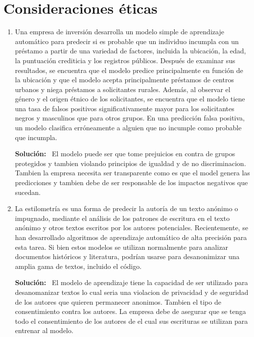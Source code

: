 \documentclass[11pt,letterpaper]{article}
\newenvironment{solution}{%
  \noindent\begin{shaded}
  \textbf{Solución:}\ }{
  \end{shaded}%
}
\begin{document}
\section*{Consideraciones éticas}

\begin{enumerate}
\item%
  Una empresa de inversión desarrolla un modelo simple de aprendizaje
  automático para predecir si es probable que un individuo incumpla
  con un préstamo a partir de una variedad de factores, incluida la
  ubicación, la edad, la puntuación crediticia y los registros
  públicos.  Después de examinar sus resultados, se encuentra que el
  modelo predice principalmente en función de la ubicación y que el
  modelo acepta principalmente préstamos de centros urbanos y niega
  préstamos a solicitantes rurales.  Además, al observar el género y
  el origen étnico de los solicitantes, se encuentra que el modelo
  tiene una tasa de falsos positivos significativamente mayor para los
  solicitantes negros y masculinos que para otros grupos.  En una
  predicción falsa positiva, un modelo clasifica erróneamente a
  alguien que no incumple como probable que incumpla.
  \begin{solution}
    El modelo puede ser que tome prejuicios en contra de grupos protegidos y tambien violando principios de igualdad y de no discriminacion. Tambien la empresa necesita ser transparente como es que el model genera las predicciones y tambien debe de ser responsable de los impactos negativos que sucedan. 
  \end{solution}
\item%
  La estilometría es una forma de predecir la autoría de un texto
  anónimo o impugnado, mediante el análisis de los patrones de
  escritura en el texto anónimo y otros textos escritos por los
  autores potenciales.  Recientemente, se han desarrollado algoritmos
  de aprendizaje automático de alta precisión para esta tarea.  Si
  bien estos modelos se utilizan normalmente para analizar documentos
  históricos y literatura, podrían usarse para desanonimizar una
  amplia gama de textos, incluido el código.
  \begin{solution}
    El modelo de aprendizaje tiene la capacidad de ser utilizado para desanomanizar textos lo cual seria una violacion de privacidad y de seguridad de los autores que quieren permanecer anonimos. Tambien el tipo de consentimiento contra los autores. La empresa debe de asegurar que se tenga todo el consentimiento de los autores de el cual sus escrituras se utilizan para entrenar al modelo.
  \end{solution}


\end{enumerate}
\end{document}
